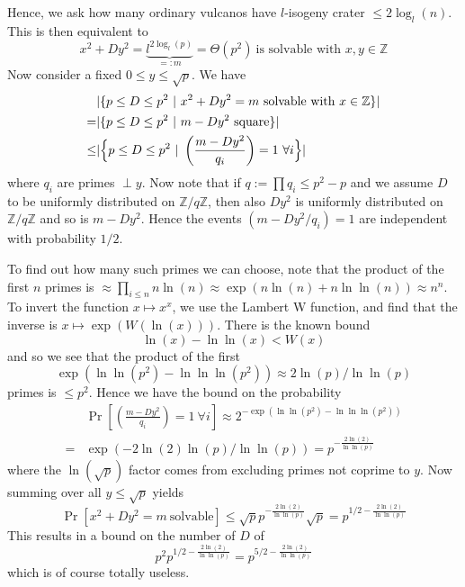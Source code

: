 \documentclass{scrartcl}
\newcommand{\Z}{\mathbb{Z}}
\theoremstyle{definition}
\begin{document}
Hence, we ask how many ordinary vulcanos have $l$-isogeny crater $\leq 2\log_l(n)$.
This is then equivalent to
\begin{equation*}
    x^2 + D y^2 = \underbrace{l^{2\log_l(p)}}_{=: m} = \Theta(p^2) \ \text{is solvable with $x, y \in \Z$}
\end{equation*}
Now consider a fixed $0 \leq y \leq \sqrt{p}$.
We have
\begin{align*}
    &|\{ p \leq D \leq p^2 \ | \ x^2 + D y^2 = m \ \text{solvable with $x \in \Z$} \}| \\
    =& |\{ p \leq D \leq p^2 \ | \ m - Dy^2 \ \text{square} \}| \\
    \leq& |\Bigl\{ p \leq D \leq p^2 \ | \ \left( \frac {m - Dy^2} {q_i} \right) = 1 \ \forall i \Bigr\}|
\end{align*}
where $q_i$ are primes $\perp y$.
Now note that if $q := \prod q_i \leq p^2 - p$ and we assume $D$ to be uniformly distributed on $\Z/q\Z$, then also $Dy^2$ is uniformly distributed on $\Z/q\Z$ and so is $m - Dy^2$.
Hence the events $(m - Dy^2/q_i) = 1$ are independent with probability $1/2$.

To find out how many such primes we can choose, note that the product of the first $n$ primes is $\approx \prod_{i \leq n} n\ln(n) \approx \exp(n\ln(n) + n\ln\ln(n)) \approx n^n$.
To invert the function $x \mapsto x^x$, we use the Lambert W function, and find that the inverse is $x \mapsto \exp(W(\ln(x)))$.
There is the known bound
\begin{equation*}
    \ln(x) - \ln\ln(x) < W(x)
\end{equation*}
and so we see that the product of the first
\begin{equation*}
    \exp(\ln\ln(p^2) - \ln\ln\ln(p^2)) \approx 2\ln(p)/\ln\ln(p)
\end{equation*}
primes is $\leq p^2$.
Hence we have the bound on the probability
\begin{align*}
    &\Pr\left[ \left(\frac {m - Dy^2} {q_i}\right) = 1 \ \forall i \right] \approx 2^{-\exp(\ln\ln(p^2) - \ln\ln\ln(p^2))} \\
    =& \exp(-2\ln(2)\ln(p)/\ln\ln(p)) = p^{-\frac {2\ln(2)} {\ln\ln(p)}}
\end{align*}
where the $\ln(\sqrt{p})$ factor comes from excluding primes not coprime to $y$.
Now summing over all $y \leq \sqrt{p}$ yields
\begin{equation*}
    \Pr[x^2 + Dy^2 = m \ \text{solvable}] \leq \sqrt{p} p^{-\frac {2\ln(2)} {\ln\ln(p)}} \sqrt{p} = p^{1/2 - \frac {2\ln(2)} {\ln\ln(p)}}
\end{equation*}
This results in a bound on the number of $D$ of
\begin{equation*}
    p^2 p^{1/2 - \frac {2\ln(2)} {\ln\ln(p)}} = p^{5/2 - \frac {2\ln(2)} {\ln\ln(p)}}
\end{equation*}
which is of course totally useless.
\end{document}
